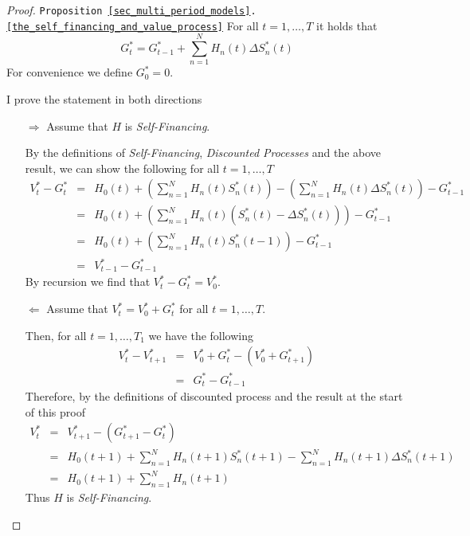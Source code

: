 \documentclass[11pt,a4paper]{article}
\begin{document}
  \begin{proof}{\texttt{Proposition \ref{sec_multi_period_models}.\ref{the_self_financing_and_value_process}}}\label{proof_self_financing_and_value_process}
    For all $t=1,\dots,T$ it holds that
    \[ G_t^*=G_{t-1}^*+\sum_{n=1}^NH_n(t)\Delta S_n^*(t) \]
    For convenience we define $G_0^*=0$.
    \par I prove the statement in both directions
    \begin{itemize}
      \item[$\Longrightarrow$] Assume that $H$ is \textit{Self-Financing}.
      \par By the definitions of \textit{Self-Financing}, \textit{Discounted Processes} and the above result, we can show the following for all $t=1,\dots,T$
      \[\begin{array}{rcl}
        V_t^*-G_t^*&=&H_0(t)+\left(\sum_{n=1}^NH_n(t)S_n^*(t)\right)-\left(\sum_{n=1}^NH_n(t)\Delta S_n^*(t)\right)-G_{t-1}^*\\
        &=&H_0(t)+\left(\sum_{n=1}^NH_n(t)(S_n^*(t)-\Delta S_n^*(t))\right)-G_{t-1}^*\\
        &=&H_0(t)+\left(\sum_{n=1}^NH_n(t)S_n^*(t-1)\right)-G_{t-1}^*\\
        &=&V_{t-1}^*-G_{t-1}^*
      \end{array}\]
      By recursion we find that $V_t^*-G_t^*=V_0^*$.

      \item[$\Longleftarrow$] Assume that $V_t^*=V_0^*+G_t^*$ for all $t=1,\dots,T$.
      \par Then, for all $t=1,\dots,T_1$ we have the following
      \[\begin{array}{rcl}
        V_t^*-V_{t+1}^*&=&V_0^*+G_t^*-(V_0^*+G_{t+1}^*)\\
        &=&G_t^*-G_{t-1}^*
      \end{array}\]
      Therefore, by the definitions of discounted process and the result at the start of this proof
      \[\begin{array}{rcl}
        V_t^*&=&V_{t+1}^*-(G_{t+1}^*-G_t^*)\\
        &=&H_0(t+1)+\sum_{n=1}^NH_n(t+1)S_n^*(t+1)-\sum_{n=1}^NH_n(t+1)\Delta S_n^*(t+1)\\
        &=&H_0(t+1)+\sum_{n=1}^NH_n(t+1)
      \end{array}\]
      Thus $H$ is \textit{Self-Financing}.
    \end{itemize}
  \end{proof}
\end{document}
